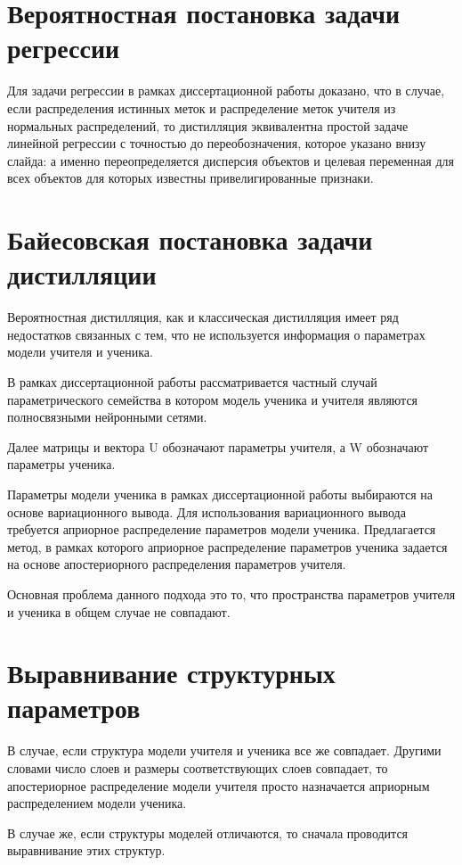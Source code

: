 \documentclass[10pt, twoside]{article}
\begin{document}
\section{Вероятностная постановка задачи регрессии}

Для задачи регрессии в рамках диссертационной работы доказано, что в случае, если распределения истинных меток и распределение меток учителя из нормальных распределений, то дистилляция эквивалентна простой задаче линейной регрессии с точностью до переобозначения, которое указано внизу слайда: а именно переопределяется дисперсия объектов и целевая переменная для всех объектов для которых известны привелигированные признаки.

\section{Байесовская постановка задачи дистилляции}
Вероятностная дистилляция, как и классическая дистилляция имеет ряд недостатков связанных с тем, что не используется информация о параметрах модели учителя и ученика.

В рамках диссертационной работы рассматривается частный случай параметрического семейства в котором модель ученика и учителя являются полносвязными нейронными сетями.

Далее матрицы и вектора U обозначают параметры учителя, а W обозначают параметры ученика.

Параметры модели ученика в рамках диссертационной работы выбираются на основе вариационного вывода. Для использования вариационного вывода требуется априорное распределение параметров модели ученика. Предлагается метод, в рамках которого априорное распределение параметров ученика задается  на основе апостериорного распределения параметров учителя.

Основная проблема данного подхода это то, что пространства параметров учителя и ученика в общем случае не совпадают.

\section{Выравнивание структурных параметров}
В случае, если структура модели учителя и ученика все же совпадает. Другими словами число слоев и размеры соответствующих слоев совпадает, то апостериорное распределение модели учителя просто назначается априорным распределением модели ученика.

В случае же, если структуры моделей отличаются, то сначала проводится выравнивание этих структур.
\end{document}
